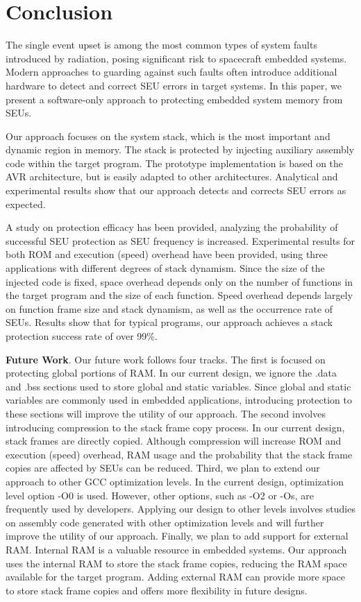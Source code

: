 \section{Conclusion}\label{sec:conclusion}

The single event upset is among the most common types of system faults introduced by radiation, posing significant risk to spacecraft embedded systems. Modern approaches to guarding against such faults often introduce additional hardware to detect and correct SEU errors in target systems. In this paper, we present a software-only approach to protecting embedded system memory from SEUs. 

Our approach focuses on the system stack, which is the most important and dynamic region in memory. The stack is protected by injecting auxiliary assembly code within the target program. The prototype implementation is based on the AVR architecture, but is easily adapted to other architectures. Analytical and experimental results show that our approach detects and corrects SEU errors as expected. 

A study on protection efficacy has been provided, analyzing the probability of successful SEU protection as SEU frequency is increased. Experimental results for both ROM and execution (speed) overhead have been provided, using three applications with different degrees of stack dynamism. Since the size of the injected code is fixed, space overhead depends only on the number of functions in the target program and the size of each function. Speed overhead depends largely on function frame size and stack dynamism, as well as the occurrence rate of SEUs. Results show that for typical programs, our approach achieves a stack protection success rate of over 99\%.

{\bf Future Work}. Our future work follows four tracks. The first is focused on protecting global portions of RAM. In our current design, we ignore the .data and .bss sections used to store global and static variables. Since global and static variables are commonly used in embedded applications, introducing protection to these sections will improve the utility of our approach. The second involves introducing compression to the stack frame copy process. In our current design, stack frames are directly copied. Although compression will increase ROM and execution (speed) overhead, RAM usage and the probability that the stack frame copies are affected by SEUs can be reduced. Third, we plan to extend our approach to other GCC optimization levels. In the current design, optimization level option -O0 is used. However, other options, such as -O2 or -Os, are frequently used by developers. Applying our design to other levels involves studies on assembly code generated with other optimization levels and will further improve the utility of our approach. Finally, we plan to add support for external RAM. Internal RAM is a valuable resource in embedded systems. Our approach uses the internal RAM to store the stack frame copies, reducing the RAM space available for the target program. Adding external RAM can provide more space to store stack frame copies and offers more flexibility in future designs.

